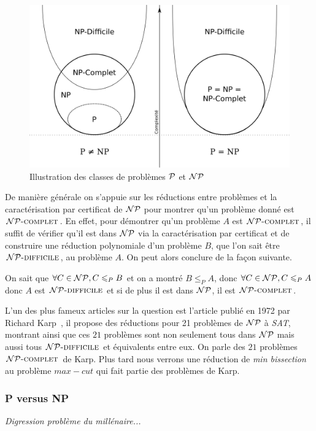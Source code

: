 \documentclass{standalone}
\begin{document}
\begin{figure}[H]
	\centering
	\includegraphics[scale=0.15]{img/pvsnp.png}
	\caption{Illustration des classes de problèmes $\mathcal{P}$ et $\mathcal{NP}$~\cite{pnp}}
	\label{pnp}
\end{figure}

De manière générale on s'appuie sur les réductions entre problèmes et la caractérisation par certificat de $\mathcal{NP}$ pour montrer qu'un problème donné est $\mathcal{NP}\text{\textsc{-complet}}$. En effet, pour démontrer qu'un problème $A$ est $\mathcal{NP}\text{\textsc{-complet}}$, il suffit de vérifier qu'il est dans $\mathcal{NP}$ via la caractérisation par certificat et de construire une réduction polynomiale d'un problème $B$, que l'on sait être $\mathcal{NP}\text{\textsc{-difficile}}$, au problème $A$. On peut alors conclure de la façon suivante.

On sait que $\forall C \in \mathcal{NP}, C \leqslant_P B$ et on a montré $B \leq_P A$, donc $\forall C \in \mathcal{NP}, C \leqslant_P A$ donc $A$ est $\mathcal{NP}\text{\textsc{-difficile}}$ et si de plus il est dans $\mathcal{NP}$, il est $\mathcal{NP}\text{\textsc{-complet}}$.

L'un des plus fameux articles sur la question est l'article publié en 1972 par Richard Karp~\cite{21karp}, il propose des réductions pour 21 problèmes de $\mathcal{NP}$ à \textit{SAT}, montrant ainsi que ces $21$ problèmes sont non seulement tous dans $\mathcal{NP}$ mais aussi tous $\mathcal{NP}\text{\textsc{-difficile}}$ et équivalents entre eux. On parle des $21$ problèmes $\mathcal{NP}\text{\textsc{-complet}}$ de Karp. Plus tard nous verrons une réduction de \emph{min bissection} au problème $max-cut$ qui fait partie des problèmes de Karp.

\subsubsection{P versus NP}

\textit{Digression problème du millénaire...}
\end{document}
